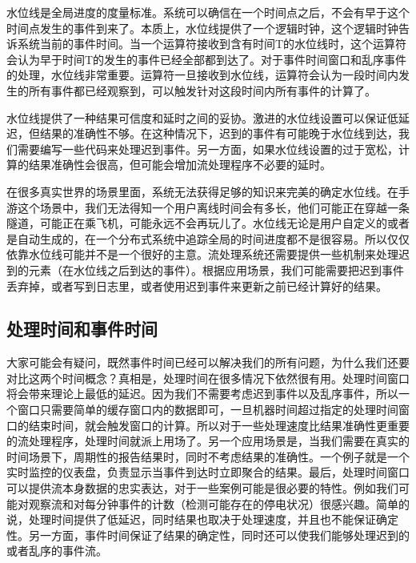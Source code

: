 \documentclass[cn,11pt,chinese]{elegantbook}
\begin{document}
水位线是全局进度的度量标准。系统可以确信在一个时间点之后，不会有早于这个时间点发生的事件到来了。本质上，水位线提供了一个逻辑时钟，这个逻辑时钟告诉系统当前的事件时间。当一个运算符接收到含有时间T的水位线时，这个运算符会认为早于时间T的发生的事件已经全部都到达了。对于事件时间窗口和乱序事件的处理，水位线非常重要。运算符一旦接收到水位线，运算符会认为一段时间内发生的所有事件都已经观察到，可以触发针对这段时间内所有事件的计算了。

水位线提供了一种结果可信度和延时之间的妥协。激进的水位线设置可以保证低延迟，但结果的准确性不够。在这种情况下，迟到的事件有可能晚于水位线到达，我们需要编写一些代码来处理迟到事件。另一方面，如果水位线设置的过于宽松，计算的结果准确性会很高，但可能会增加流处理程序不必要的延时。

在很多真实世界的场景里面，系统无法获得足够的知识来完美的确定水位线。在手游这个场景中，我们无法得知一个用户离线时间会有多长，他们可能正在穿越一条隧道，可能正在乘飞机，可能永远不会再玩儿了。水位线无论是用户自定义的或者是自动生成的，在一个分布式系统中追踪全局的时间进度都不是很容易。所以仅仅依靠水位线可能并不是一个很好的主意。流处理系统还需要提供一些机制来处理迟到的元素（在水位线之后到达的事件）。根据应用场景，我们可能需要把迟到事件丢弃掉，或者写到日志里，或者使用迟到事件来更新之前已经计算好的结果。

\hypertarget{ux5904ux7406ux65f6ux95f4ux548cux4e8bux4ef6ux65f6ux95f4}{%
\subsection{处理时间和事件时间}\label{ux5904ux7406ux65f6ux95f4ux548cux4e8bux4ef6ux65f6ux95f4}}

大家可能会有疑问，既然事件时间已经可以解决我们的所有问题，为什么我们还要对比这两个时间概念？真相是，处理时间在很多情况下依然很有用。处理时间窗口将会带来理论上最低的延迟。因为我们不需要考虑迟到事件以及乱序事件，所以一个窗口只需要简单的缓存窗口内的数据即可，一旦机器时间超过指定的处理时间窗口的结束时间，就会触发窗口的计算。所以对于一些处理速度比结果准确性更重要的流处理程序，处理时间就派上用场了。另一个应用场景是，当我们需要在真实的时间场景下，周期性的报告结果时，同时不考虑结果的准确性。一个例子就是一个实时监控的仪表盘，负责显示当事件到达时立即聚合的结果。最后，处理时间窗口可以提供流本身数据的忠实表达，对于一些案例可能是很必要的特性。例如我们可能对观察流和对每分钟事件的计数（检测可能存在的停电状况）很感兴趣。简单的说，处理时间提供了低延迟，同时结果也取决于处理速度，并且也不能保证确定性。另一方面，事件时间保证了结果的确定性，同时还可以使我们能够处理迟到的或者乱序的事件流。
\end{document}
